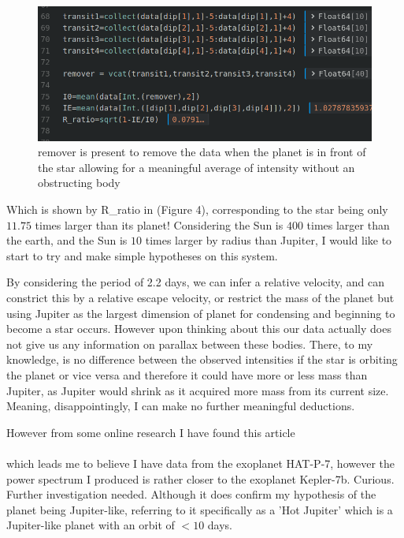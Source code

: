 \documentclass[a4paper,12pt,notitlepage]{article}
\begin{document}
\begin{figure}[h]
    \centering
    \includegraphics[width=\textwidth]{radii.png}
    \caption{remover is present to remove the data when the planet is in front of the star allowing for a meaningful average of intensity without an obstructing body}
\end{figure}

Which is shown by R\_ratio in (Figure 4), corresponding to the star being only $11.75$ times larger than its planet! Considering the Sun is $400$ times larger than the earth, and the Sun is $10$ times larger by radius than Jupiter, I would like to start to try and make simple hypotheses on this system.

By considering the period of 2.2 days, we can infer a relative velocity, and can constrict this by a relative escape velocity, or restrict the mass of the planet but using Jupiter as the largest dimension of planet for condensing and beginning to become a star occurs. However upon thinking about this our data actually does not give us any information on parallax between these bodies. There, to my knowledge, is no difference between the observed intensities if the star is orbiting the planet or vice versa and therefore it could have more or less mass than Jupiter, as Jupiter would shrink as it acquired more mass from its current size. Meaning, disappointingly, I can make no further meaningful deductions.

However from some online research I have found this article\\ [http://sac.au.dk/fileadmin/www.sac.au.dk/Project\_updated\_gr.1.pdf]\\
which leads me to believe I have data from the exoplanet HAT-P-7, however the power spectrum I produced is rather closer to the exoplanet Kepler-7b. Curious. Further investigation needed. Although it does confirm my hypothesis of the planet being Jupiter-like, referring to it specifically as a 'Hot Jupiter' which is a Jupiter-like planet with an orbit of $< 10$ days.
\end{document}
